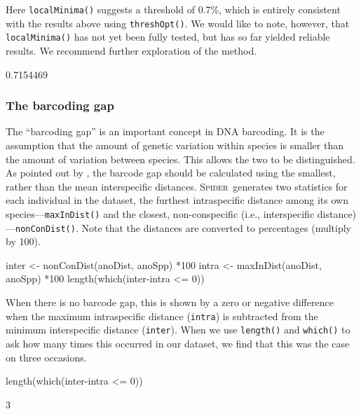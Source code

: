 \documentclass{article}
\newcommand{\Spider}{\textsc{Spider}} %
\newcommand{\fun}[1]{\texttt{#1}}
\begin{document}
Here \fun{localMinima()} suggests a threshold of 0.7\%, which is entirely consistent with the results above using \fun{threshOpt()}. We would like to note, however, that \fun{localMinima()} has not yet been fully tested, but has so far yielded reliable results. We recommend further exploration of the method.


\begin{Routput}
[1] 0.7154469
\end{Routput}


\subsubsection{The barcoding gap}

The ``barcoding gap'' \citep{Meye.Paul.2005} is an important concept in DNA barcoding. It is the assumption that the amount of genetic variation within species is smaller than the amount of variation between species. This allows the two to be distinguished. As pointed out by \citet{Meier2008}, the barcode gap should be calculated using the smallest, rather than the mean interspecific distances. \Spider~generates two statistics for each individual in the dataset, the furthest intraspecific distance among its own species---\fun{maxInDist()} and the closest, non-conspecific (i.e., interspecific distance)---\fun{nonConDist()}. Note that the distances are converted to percentages (multiply by 100).

\begin{console}
inter <- nonConDist(anoDist, anoSpp) *100
intra <- maxInDist(anoDist, anoSpp) *100
length(which(inter-intra <= 0))
\end{console}

When there is no barcode gap, this is shown by a zero or negative difference when the maximum intraspecific distance (\fun{intra}) is subtracted from the minimum interspecific distance (\fun{inter}). When we use \fun{length()} and \fun{which()} to ask how many times this occurred in our dataset, we find that this was the case on three occasions.

\begin{console}
length(which(inter-intra <= 0))
\end{console}

\begin{Routput}
[1] 3
\end{Routput}
\end{document}
